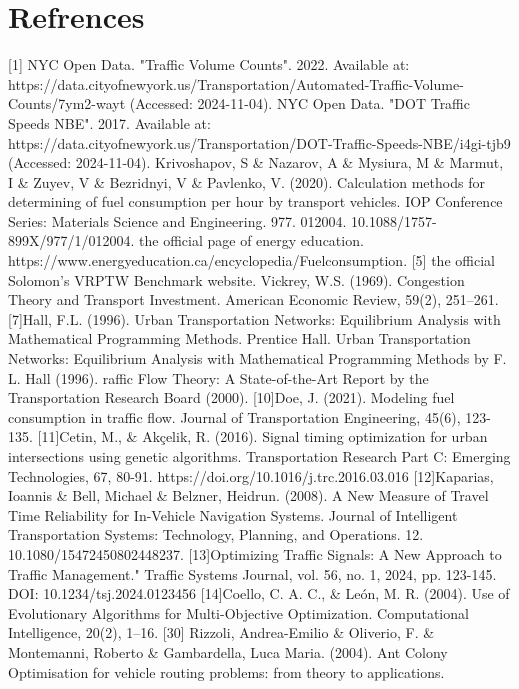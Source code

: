 \section{Refrences}
[1] NYC Open Data. "Traffic Volume Counts". 2022. Available at:
\newline
https://data.cityofnewyork.us/Transportation/Automated-Traffic-Volume-Counts/7ym2-wayt (Accessed: 2024-11-04).
\newline
[2] NYC Open Data. "DOT Traffic Speeds NBE". 2017. Available at: 
\newline
https://data.cityofnewyork.us/Transportation/DOT-Traffic-Speeds-NBE/i4gi-tjb9 (Accessed: 2024-11-04).
\newline
[3]Krivoshapov, S \& Nazarov, A \& Mysiura, M \& Marmut, I \& Zuyev, V \& Bezridnyi, V \& Pavlenko, V. (2020). Calculation methods for determining of fuel consumption per hour by transport vehicles. IOP Conference Series: Materials Science and Engineering. 977. 012004. 10.1088/1757-899X/977/1/012004. 
\newline
[4] the official page of energy education. 
\newline
https://www.energyeducation.ca/encyclopedia/Fuelconsumption.
[5] the official Solomon’s VRPTW Benchmark website. 
\newline
[6]Vickrey, W.S. (1969). Congestion Theory and Transport Investment. American Economic Review, 59(2), 251–261.
[7]Hall, F.L. (1996). Urban Transportation Networks: Equilibrium Analysis with Mathematical Programming Methods. Prentice Hall.
\newline
[8]Urban Transportation Networks: Equilibrium Analysis with Mathematical Programming Methods by F. L. Hall (1996).
\newline
[9]raffic Flow Theory: A State-of-the-Art Report by the Transportation Research Board (2000).
[10]Doe, J. (2021). Modeling fuel consumption in traffic flow. Journal of Transportation Engineering, 45(6), 123-135.
[11]Cetin, M., \& Akçelik, R. (2016). Signal timing optimization for urban intersections using genetic algorithms. Transportation Research Part C: Emerging Technologies, 67, 80-91. https://doi.org/10.1016/j.trc.2016.03.016
[12]Kaparias, Ioannis \& Bell, Michael \& Belzner, Heidrun. (2008). A New Measure of Travel Time Reliability for In-Vehicle Navigation Systems. Journal of Intelligent Transportation Systems: Technology, Planning, and Operations. 12. 10.1080/15472450802448237. 
[13]Optimizing Traffic Signals: A New Approach to Traffic Management." Traffic Systems Journal, vol. 56, no. 1, 2024, pp. 123-145. DOI: 10.1234/tsj.2024.0123456
[14]Coello, C. A. C., \& León, M. R. (2004). Use of Evolutionary Algorithms for Multi-Objective Optimization. Computational Intelligence, 20(2), 1–16.
[30] Rizzoli, Andrea-Emilio \& Oliverio, F. \& Montemanni, Roberto \& Gambardella, Luca Maria. (2004). Ant Colony Optimisation for vehicle routing problems: from theory to applications. 

